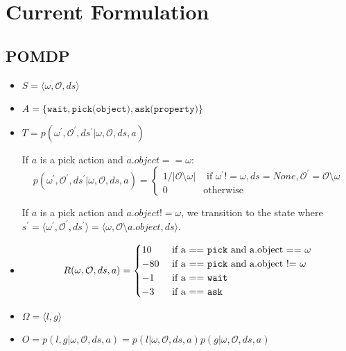 \documentclass{article}
\begin{document}
\section{Current Formulation}

\subsection{POMDP}

\begin{itemize}
	\item $S = \langle \omega, \mathcal{O}, ds\rangle$

	\item $A = \{ \texttt{wait}, \texttt{pick(object)}, \texttt{ask(property)} \}$
	\item $T = p(\omega^\prime, \mathcal{O}^\prime, ds^\prime| \omega, \mathcal{O}, ds, a)$

		If $a$ is a pick action and $a.object == \omega$:
		\begin{equation*}
			p(\omega^\prime, \mathcal{O}^\prime, ds^\prime| \omega, \mathcal{O}, ds, a) = \begin{cases}
				1 / |\mathcal{O} \setminus \omega| & \text{ if $\omega^\prime != \omega, ds = None, \mathcal{O}^\prime = \mathcal{O}\setminus \omega$} \\
				0 & \text{otherwise}
			\end{cases}
		\end{equation*}

		If $a$ is a pick action and $a.object != \omega$, we transition to the state where $s^\prime = \langle \omega^\prime, \mathcal{O}^\prime, ds^\prime \rangle = \langle \omega, \mathcal{O} \setminus a.object, ds\rangle$. 

	\item 
		\begin{equation*}
			R(\omega, \mathcal{O}, ds, a) = 
			\begin{cases}
				10 & \text{ if a == \texttt{pick} and a.object == $\omega$} \\
				-80 & \text{ if a == \texttt{pick} and a.object != $\omega$} \\
				-1 & \text{ if a == \texttt{wait}} \\
				-3 & \text{ if a == \texttt{ask}}
			\end{cases}
		\end{equation*}
	\item $\Omega = \langle l, g \rangle$
	\item $O = p(l, g | \omega, \mathcal{O}, ds, a) = p(l | \omega, \mathcal{O}, ds, a)  p(g | \omega, \mathcal{O}, ds, a)    $


\end{itemize}
\end{document}
